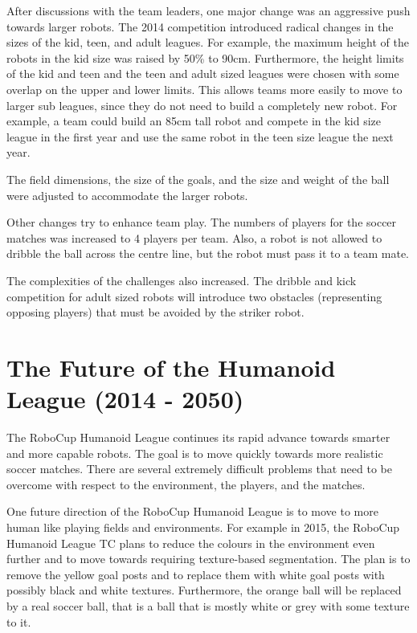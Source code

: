 \documentclass{llncs}
\begin{document}
After discussions with the team leaders, one major change was an
aggressive push towards larger robots. The 2014 competition introduced
radical changes in the sizes of the kid, teen, and adult leagues. For
example, the maximum height of the robots in the kid size was raised
by 50\% to 90cm. Furthermore, the height limits of the kid and teen
and the teen and adult sized leagues were chosen with some overlap on
the upper and lower limits. This allows teams more easily to move to
larger sub leagues, since they do not need to build a completely new
robot. For example, a team could build an 85cm tall robot and compete
in the kid size league in the first year and use the same robot in the
teen size league the next year.

The field dimensions, the size of the goals, and the size and weight
of the ball were adjusted to accommodate the larger robots.

Other changes try to enhance team play. The numbers of players for the
soccer matches was increased to 4 players per team.  Also, a robot is
not allowed to dribble the ball across the centre line, but the robot
must pass it to a team mate.

The complexities of the challenges also increased. The dribble and
kick competition for adult sized robots will introduce two obstacles
(representing opposing players) that must be avoided by the striker
robot.

\section{The Future of the Humanoid League (2014 - 2050)}
\label{sec:five}

The RoboCup Humanoid League continues its rapid advance towards
smarter and more capable robots. The goal is to move quickly towards
more realistic soccer matches. There are several extremely difficult
problems that need to be overcome with respect to the environment, the
players, and the matches.

One future direction of the RoboCup Humanoid League is to move to more
human like playing fields and environments. For example in 2015, the
RoboCup Humanoid League TC plans to reduce the colours in the
environment even further and to move towards requiring texture-based
segmentation. The plan is to remove the yellow goal posts and to
replace them with white goal posts with possibly black and white
textures. Furthermore, the orange ball will be replaced by a real
soccer ball, that is a ball that is mostly white or grey with some
texture to it.
\end{document}
